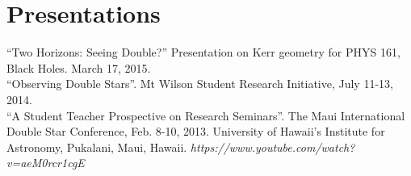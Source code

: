 \section{Presentations}

``Two Horizons: Seeing Double?'' Presentation on Kerr geometry for PHYS 161, Black Holes. March 17, 2015.\\
``Observing Double Stars''. Mt Wilson Student Research Initiative, July 11-13, 2014.\\
``A Student Teacher Prospective on Research Seminars''. The Maui International Double Star Conference, Feb. 8-10, 2013. University of Hawaii’s Institute for Astronomy, Pukalani, Maui, Hawaii.
{\sl https://www.youtube.com/watch?v=aeM0rcr1cgE }
